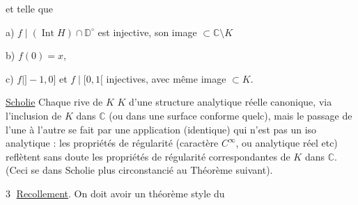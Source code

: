 et telle que

a) $f\mid(\operatorname{Int}H)\cap\mathbb D^\circ$ est injective, son image $\subset\mathbb C\setminus K$

b) $f(0)=x$, 

c) $f\mid]-1,0]$ et $f\mid[0,1[$ injectives, avec
même image $\subset K$.

\uline{Scholie} Chaque rive de $K$  $K$ d'une
structure analytique réelle canonique, via
l'inclusion de $K$ dans $\mathbb C$ (ou dans une
surface conforme quelc), mais le passage
de l'une à l'autre se fait par une
application (identique) qui n'est pas un
iso analytique : les propriétés de régularité
(caractère $C^\infty$, ou analytique réel etc)
reflètent sans doute les propriétés de
régularité correspondantes de $K$ dans $\mathbb C$.
(Ceci  se  dans  Scholie
plus circonstancié au Théorème suivant).

\textcircled{3} \uline{Recollement}. On doit avoir un
théorème  style du
